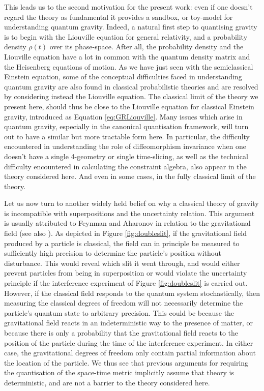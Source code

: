 \documentclass[aps,pra,showpacs,citeautoscript,amsmath,amssymb,floatfix,superscriptaddress,bbm, verbatim,amsfonts,changes,10pt,nofootinbib,longbibliography]{revtex4-1}
\begin{document}
This leads us to the second motivation for the present work: even if one doesn't regard the theory as fundamental it provides a sandbox, or toy-model for understanding quantum gravity.  Indeed, a natural first step to quantising gravity is to begin with the Liouville equation for general relativity, and a probability density $\rho(t)$ over its phase-space.  After all, the probability density and the Liouville equation have a lot in common with the quantum density matrix and the Heisenberg equations of motion. As we have just seen with the semiclassical Einstein equation, some of the conceptual difficulties faced in understanding quantum gravity are also found in classical probabilistic theories and are resolved by considering instead the Liouville equation. The classical limit of the theory we present here, should thus be close to the Liouville equation for classical Einstein gravity, introduced as Equation \eqref{eq:GRLiouville}.
Many issues which arise in quantum gravity, especially in the canonical quantisation framework, will turn out to have a similar but more tractable form here. In particular, the difficulty encountered in understanding the role of diffeomorphism invariance when one doesn't have a single 4-geometry or single time-slicing, as well as the technical difficulty encountered in calculating the constraint algebra, also appear in the theory considered here. And even in some cases, in the fully classical limit of the theory.


Let us now turn to another widely held belief on why a classical theory of gravity is incompatible with superpositions and the uncertainty relation. This argument is usually attributed to Feynman\cite{cecile2011role,Feynman:1996kb-note} and Aharonov\cite{AharonovParadoxes-note} in relation to the gravitational field (see also \cite{eppley1977necessity,Mari:2015qva,Baym3035,belenchia2018quantum,signal_foot}). As depicted in Figure \ref{fig:doubleslit}, if the gravitational field produced by a particle is classical, the field can in principle be measured to sufficiently high precision  
to determine the particle's position without disturbance. This would reveal which slit it went through, and would either prevent particles from being in superposition or would violate the uncertainty principle if the interference experiment of Figure \ref{fig:doubleslit} is carried out.  However, if the classical field responds to the quantum system stochastically\label{par:stochastic}\cite{hustochasticgravity_foot}, then measuring the classical degrees of freedom will not necessarily determine the particle's quantum state to arbitrary precision. This could be because the gravitational field reacts in an indeterministic way to the presence of matter,  or because there is only a probability that the gravitational field reacts to the position of the particle during the time of the interference experiment\cite{experiment_foot}. In either case, the gravitational degrees of freedom only contain partial information about the location of the particle. We thus see that previous arguments for requiring the quantisation of the space-time metric implicitly assume that theory is deterministic, and are not a barrier to the theory considered here.
\end{document}
